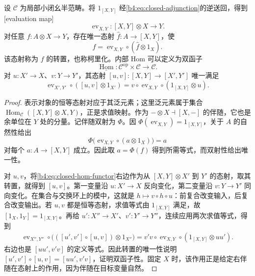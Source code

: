 \begin{proposition}\label{b4:prop:closed-evaluation-transpose}
	设 \(\mathcal C\) 为局部小闭幺半范畴。将 \(1_{[X,Y]}\) 经\eqref{b4:eq:closed-adjunction}的逆送回，得到[evaluation map]
	\[
		\operatorname{ev}_{X,Y}:[X,Y]\otimes X\longrightarrow Y.
	\]
	对任意 \(f:A\otimes X\to Y\)，存在唯一态射 \(\widehat f:A\to[X,Y]\)，使
	\begin{equation}\label{b4:eq:closed-transpose}
		f=\operatorname{ev}_{X,Y}\circ(\widehat f\otimes1_X).
	\end{equation}
	该态射称为 \(f\) 的转置，也称柯里化。内部 Hom 可以定义为双函子
	\[
		\underline{\operatorname{Hom}}:\mathcal C^{\mathrm{op}}\times\mathcal C\longrightarrow\mathcal C.
	\]
	对 \(u:X'\to X\)、\(v:Y\to Y'\)，其态射 \([u,v]:[X,Y]\to[X',Y']\) 唯一满足
	\begin{equation}\label{b4:eq:closed-hom-functor}
		\operatorname{ev}_{X',Y'}\circ([u,v]\otimes1_{X'}) =v\circ\operatorname{ev}_{X,Y}\circ(1_{[X,Y]}\otimes u).
	\end{equation}
\end{proposition}
\begin{proof}
	表示对象的恒等态射对应于其泛元素；这里泛元素属于集合 \(\operatorname{Hom}_{\mathcal C}([X,Y]\otimes X,Y)\)，正是求值映射。作为 \(-\otimes X\dashv[X,-]\) 的伴随，它也是余单位在 \(Y\) 处的分量。记伴随双射为 \(\Phi\)。因 \(\Phi(\operatorname{ev}_{X,Y})=1_{[X,Y]}\)，关于 \(A\) 的自然性给出
	\[
		\Phi\bigl(\operatorname{ev}_{X,Y}\circ(a\otimes1_X)\bigr)=a
	\]
	对每个 \(a:A\to[X,Y]\) 成立。因此取 \(a=\Phi(f)\) 得到所需等式，而双射性给出唯一性。

	对 \(u,v\)，将\eqref{b4:eq:closed-hom-functor}右边作为从 \([X,Y]\otimes X'\) 到 \(Y'\) 的态射，取其转置，就得到 \([u,v]\)。第一变量沿 \(u:X'\to X\) 反向变化，第二变量沿 \(v:Y\to Y'\) 同向变化。在集合与交换环上的模中，这就是 \(h\mapsto v\circ h\circ u\)：前复合改变输入，后复合改变输出。若 \(u,v\) 都是恒等态射，求值等式由 \(1_{[X,Y]}\) 满足，故 \([1_X,1_Y]=1_{[X,Y]}\)。再给 \(u':X''\to X'\)、\(v':Y'\to Y''\)，连续应用两次求值等式，得到
	\[
		\begin{aligned}
			\operatorname{ev}_{X'',Y''}\circ\bigl(([u',v']\circ[u,v])\otimes1_{X''}\bigr) =v'v\circ\operatorname{ev}_{X,Y}\circ(1_{[X,Y]}\otimes uu').
		\end{aligned}
	\]
	右边也是 \([uu',v'v]\) 的定义等式。因此转置的唯一性说明 \([u',v']\circ[u,v]=[uu',v'v]\)，证明双函子性。固定 \(X\) 时，该作用正是给定右伴随在态射上的作用，因为伴随在目标变量自然。
\end{proof}

